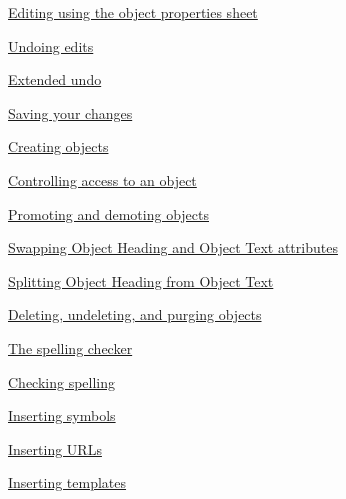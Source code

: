 \documentclass[11pt,a4paper]{article}
\begin{document}
\href{https://www.ibm.com/support/knowledgecenter/search/Editing%20using%20the%20object%20properties%20sheet?scope=SSYQBZ_9.6.1}{Editing using the object properties sheet}

\href{https://www.ibm.com/support/knowledgecenter/search/Undoing%20edits?scope=SSYQBZ_9.6.1}{Undoing edits}

\href{https://www.ibm.com/support/knowledgecenter/search/Extended%20undo?scope=SSYQBZ_9.6.1}{Extended undo}

\href{https://www.ibm.com/support/knowledgecenter/search/Saving%20your%20changes?scope=SSYQBZ_9.6.1}{Saving your changes}

\href{https://www.ibm.com/support/knowledgecenter/search/Creating%20objects?scope=SSYQBZ_9.6.1}{Creating objects}

\href{https://www.ibm.com/support/knowledgecenter/search/Controlling%20access%20to%20an%20object?scope=SSYQBZ_9.6.1}{Controlling access to an object}

\href{https://www.ibm.com/support/knowledgecenter/search/Promoting%20and%20demoting%20objects?scope=SSYQBZ_9.6.1}{Promoting and demoting objects}

\href{https://www.ibm.com/support/knowledgecenter/search/Swapping%20Object%20Heading%20and%20Object%20Text%20attributes?scope=SSYQBZ_9.6.1}{Swapping Object Heading and Object Text attributes}

\href{https://www.ibm.com/support/knowledgecenter/search/Splitting%20Object%20Heading%20from%20Object%20Text?scope=SSYQBZ_9.6.1}{Splitting Object Heading from Object Text}

\href{https://www.ibm.com/support/knowledgecenter/search/Deleting,%20undeleting,%20and%20purging%20objects?scope=SSYQBZ_9.6.1}{Deleting, undeleting, and purging objects}

\href{https://www.ibm.com/support/knowledgecenter/search/The%20spelling%20checker?scope=SSYQBZ_9.6.1}{The spelling checker}

\href{https://www.ibm.com/support/knowledgecenter/search/Checking%20spelling?scope=SSYQBZ_9.6.1}{Checking spelling}

\href{https://www.ibm.com/support/knowledgecenter/search/Inserting%20symbols?scope=SSYQBZ_9.6.1}{Inserting symbols}

\href{https://www.ibm.com/support/knowledgecenter/search/Inserting%20URLs?scope=SSYQBZ_9.6.1}{Inserting URLs}

\href{https://www.ibm.com/support/knowledgecenter/search/Inserting%20templates?scope=SSYQBZ_9.6.1}{Inserting templates}
\end{document}
